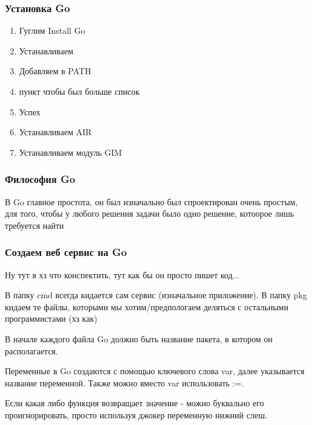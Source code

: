 \documentclass[a4paper,12pt]{article}
\begin{document}
\subsubsection{Установка Go}
\begin{enumerate}
    \item Гуглим Install Go
    \item Устанавливаем
    \item Добавляем в PATH
    \item пункт чтобы был больше список
    \item Успех
    \item Устанавливаем AIR
    \item Устанавливаем модуль GIM
\end{enumerate}
\subsubsection{Философия Go}
В Go главное простота, он был изначально был спроектирован очень простым, для того, чтобы у любого решения 
задачи было одно решение, котоорое лишь требуется найти
\subsubsection{Создаем веб сервис на Go}
Ну тут я хз что конспектить, тут как бы он просто пишет код... 

В папку cmd всегда кидается сам сервис (изначальное приложение). В папку pkg кидаем те файлы, которыми мы хотим/предпологаем деляться с остальными программистами (хз как)

В начале каждого файла Go должно быть название пакета, в котором он располагается. 

Переменные в Go создаются с помощью ключевого слова var, далее указывается название переменной. Также можно вместо var использовать :=. 

Если какая либо функция возвращает значение - можно буквально его проигнорировать, просто используя джокер переменную нижний слеш.
\end{document}

